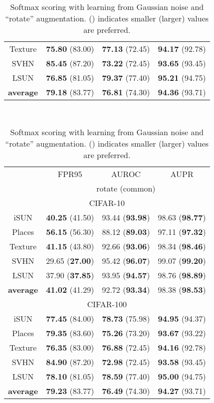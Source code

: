 \documentclass{article}
\begin{document}
\begin{table}[t]
{{\begin{tabular}{c|ccc}
Texture            & \textbf{75.80} (83.00) & \textbf{77.13} (72.45) & \textbf{94.17} (92.78) \\
SVHN               & \textbf{85.45} (87.20) & \textbf{73.22} (72.45) & \textbf{93.65} (93.45) \\
LSUN               & \textbf{76.85} (81.05) & \textbf{79.37} (77.40) & \textbf{95.21} (94.75) \\
\midrule
\textbf{average}   & \textbf{79.18} (83.77) & \textbf{76.81} (74.30) & \textbf{94.36} (93.71) \\ \bottomrule[1.5pt]      
\end{tabular}
}}~~~~
\parbox{.47\linewidth}{
\centering
\caption{{Softmax scoring with learning from Gaussian noise and ``rotate'' augmentation.  () indicates smaller (larger) values are preferred.}} \label{tab: softmax rotate}
\vspace{5pt}
\scriptsize{
\begin{tabular}{c|ccc}
\toprule[1.5pt]
                   & FPR95      & AUROC        & AUPR       \\
                   \cline{2-4} 
\multirow{-2}{*}{} & \multicolumn{3}{c}{rotate (common)} \\
\midrule[0.6pt]
\multicolumn{4}{c}{\cellcolor{greyL}CIFAR-10} \\
\midrule[0.6pt]
iSUN               & \textbf{40.25} (41.50) & 93.44 (\textbf{93.98}) & 98.63 (\textbf{98.77}) \\ 
Places        & \textbf{56.15} (56.30) & 88.12 (\textbf{89.03}) & 97.11 (\textbf{97.32}) \\
Texture            & \textbf{41.15} (43.80) & 92.66 (\textbf{93.06}) & 98.34 (\textbf{98.46}) \\
SVHN               & 29.65 (\textbf{27.00}) & 95.42 (\textbf{96.07}) & {99.07} (\textbf{99.20}) \\
LSUN               & 37.90 (\textbf{37.85}) & 93.95 (\textbf{94.57}) & 98.76 (\textbf{98.89}) \\
\midrule
\textbf{average}   & \textbf{41.02} (41.29) & {92.72} (\textbf{93.34}) & {98.38} (\textbf{98.53}) \\ \midrule[1pt]
\multicolumn{4}{c}{\cellcolor{greyL}CIFAR-100} \\
\midrule[1pt]
iSUN               & \textbf{77.45} (84.00) & \textbf{78.73} (75.98) & \textbf{94.95} (94.37) \\ 
Places        & \textbf{79.35} (83.60) & \textbf{75.26} (73.20) & \textbf{93.67} (93.22) \\
Texture            & \textbf{76.35} (83.00) & \textbf{76.88} (72.45) & \textbf{94.16} (92.78) \\
SVHN               & \textbf{84.90} (87.20) & \textbf{72.98} (72.45) & \textbf{93.58} (93.45) \\
LSUN               & \textbf{78.10} (81.05) & \textbf{78.59} (77.40) & \textbf{95.00} (94.75) \\
\midrule
\textbf{average}   & \textbf{79.23} (83.77) & \textbf{76.49} (74.30) & \textbf{94.27} (93.71) \\ \bottomrule[1.5pt]      
\end{tabular}
}}
\end{table}
\end{document}
